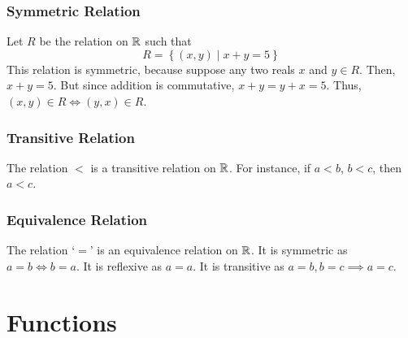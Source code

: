 \subsubsection{Symmetric Relation}


\begin{example}
    Let \(R\) be the relation on \(\mathbb R\) such that \[
        R = \left\{(x,y) \mid x + y = 5\right\}
    \]
    This relation is symmetric, because suppose any two reals \(x\) and \(y \in R\). Then,
    \(x + y = 5\). But since addition is commutative, \(x + y = y + x = 5\). 
    Thus, \((x,y) \in R \iff (y,x) \in R\).
\end{example}

\subsubsection{Transitive Relation}


\begin{example}
    The relation \(<\) is a transitive relation on \(\mathbb R\). For instance, if \(a < b\), \(b < c\),
    then \(a < c\).
\end{example}

\subsubsection{Equivalence Relation}



\begin{example}
    The relation `\(=\)' is an equivalence relation on \(\mathbb R\). It is symmetric as \(a = b \iff b = a\). 
    It is reflexive as \(a = a\). It is transitive as \(a = b, b = c \implies a = c\).
\end{example}

\section{Functions}

